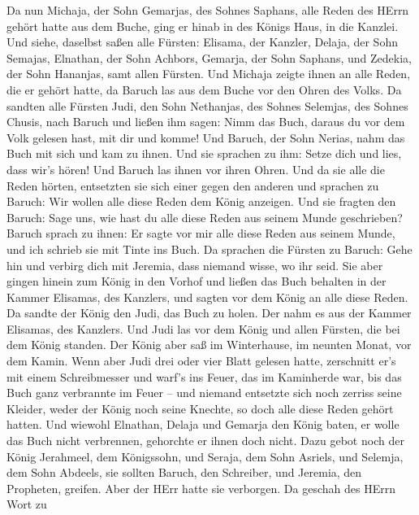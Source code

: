  Da nun Michaja, der Sohn Gemarjas, des Sohnes Saphans,
alle Reden des HErrn gehört hatte aus dem Buche,  ging er
hinab in des Königs Haus, in die Kanzlei. Und siehe, daselbst saßen alle
Fürsten: Elisama, der Kanzler, Delaja, der Sohn Semajas, Elnathan, der
Sohn Achbors, Gemarja, der Sohn Saphans, und Zedekia, der Sohn Hananjas,
samt allen Fürsten.  Und Michaja zeigte ihnen an alle
Reden, die er gehört hatte, da Baruch las aus dem Buche vor den Ohren
des Volks.  Da sandten alle Fürsten Judi, den Sohn
Nethanjas, des Sohnes Selemjas, des Sohnes Chusis, nach Baruch und
ließen ihm sagen: Nimm das Buch, daraus du vor dem Volk gelesen hast,
mit dir und komme! Und Baruch, der Sohn Nerias, nahm das Buch mit sich
und kam zu ihnen.  Und sie sprachen zu ihm: Setze dich und
lies, dass wir's hören! Und Baruch las ihnen vor ihren Ohren.
 Und da sie alle die Reden hörten, entsetzten sie sich
einer gegen den anderen und sprachen zu Baruch: Wir wollen alle diese
Reden dem König anzeigen.  Und sie fragten den Baruch: Sage
uns, wie hast du alle diese Reden aus seinem Munde geschrieben?
 Baruch sprach zu ihnen: Er sagte vor mir alle diese Reden
aus seinem Munde, und ich schrieb sie mit Tinte ins Buch. 
Da sprachen die Fürsten zu Baruch: Gehe hin und verbirg dich mit
Jeremia, dass niemand wisse, wo ihr seid.  Sie aber gingen
hinein zum König in den Vorhof und ließen das Buch behalten in der
Kammer Elisamas, des Kanzlers, und sagten vor dem König an alle diese
Reden.  Da sandte der König den Judi, das Buch zu holen.
Der nahm es aus der Kammer Elisamas, des Kanzlers. Und Judi las vor dem
König und allen Fürsten, die bei dem König standen.  Der
König aber saß im Winterhause, im neunten Monat, vor dem Kamin.
 Wenn aber Judi drei oder vier Blatt gelesen hatte,
zerschnitt er's mit einem Schreibmesser und warf's ins Feuer, das im
Kaminherde war, bis das Buch ganz verbrannte im Feuer -- 
und niemand entsetzte sich noch zerriss seine Kleider, weder der König
noch seine Knechte, so doch alle diese Reden gehört hatten.
 Und wiewohl Elnathan, Delaja und Gemarja den König baten,
er wolle das Buch nicht verbrennen, gehorchte er ihnen doch nicht.
 Dazu gebot noch der König Jerahmeel, dem Königssohn, und
Seraja, dem Sohn Asriels, und Selemja, dem Sohn Abdeels, sie sollten
Baruch, den Schreiber, und Jeremia, den Propheten, greifen. Aber der
HErr hatte sie verborgen.  Da geschah des HErrn Wort zu
